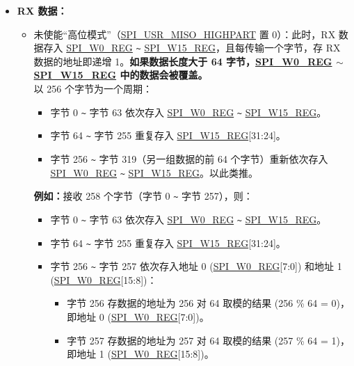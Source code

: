 \documentclass[main\_\_CN.tex]{subfiles}
\begin{document}
\begin{itemize}
\begin{itemize}
        
    \end{itemize}
    \item \textbf{RX 数据：}
    \begin{itemize}
        \item 未使能“高位模式”（\hyperref[fielddesc:SPIUSRMISOHIGHPART]{SPI\_USR\_MISO\_HIGHPART} 置 0）：此时，RX 数据存入 \hyperref[regdesc:SPIW0REG]{SPI\_W0\_REG} \verb+~+ \hyperref[regdesc:SPIW0REG]{SPI\_W15\_REG}，且每传输一个字节，存 RX 数据的地址即递增 1。\textbf{如果数据长度大于 64 字节，\hyperref[regdesc:SPIW0REG]{SPI\_W0\_REG} $\sim$ \hyperref[regdesc:SPIW0REG]{SPI\_W15\_REG} 中的数据会被覆盖。}\\
        以 256 个字节为一个周期：
        \begin{itemize}
            \item 字节 0 \verb+~+ 字节 63 依次存入 \hyperref[regdesc:SPIW0REG]{SPI\_W0\_REG} \verb+~+ \hyperref[regdesc:SPIW0REG]{SPI\_W15\_REG}。
            \item 字节 64 \verb+~+ 字节 255 重复存入 \hyperref[regdesc:SPIW0REG]{SPI\_W15\_REG}[31:24]。
            \item 字节 256 \verb+~+ 字节 319（另一组数据的前 64 个字节）重新依次存入 \hyperref[regdesc:SPIW0REG]{SPI\_W0\_REG} \verb+~+ \hyperref[regdesc:SPIW0REG]{SPI\_W15\_REG}。以此类推。
        \end{itemize}
        \textbf{例如：}接收 258 个字节（字节 0 \verb+~+ 字节 257），则：
        \begin{itemize}
            \item 字节 0 \verb+~+ 字节 63 依次存入 \hyperref[regdesc:SPIW0REG]{SPI\_W0\_REG} \verb+~+ \hyperref[regdesc:SPIW0REG]{SPI\_W15\_REG}。
            \item 字节 64 \verb+~+ 字节 255 重复存入 \hyperref[regdesc:SPIW0REG]{SPI\_W15\_REG}[31:24]。
            \item 字节 256 \verb+~+ 字节 257 依次存入地址 0 (\hyperref[regdesc:SPIW0REG]{SPI\_W0\_REG}[7:0]) 和地址 1 (\hyperref[regdesc:SPIW0REG]{SPI\_W0\_REG}[15:8])：
            \begin{itemize}
                \item 字节 256 存数据的地址为 256 对 64 取模的结果 (256 \% 64 = 0)，即地址 0 (\hyperref[regdesc:SPIW0REG]{SPI\_W0\_REG}[7:0])。
                \item 字节 257 存数据的地址为 257 对 64 取模的结果 (257 \% 64 = 1)，即地址 1 (\hyperref[regdesc:SPIW0REG]{SPI\_W0\_REG}[15:8])。
            \end{itemize}
        \end{itemize}

\end{itemize}
\end{itemize}
\end{document}
